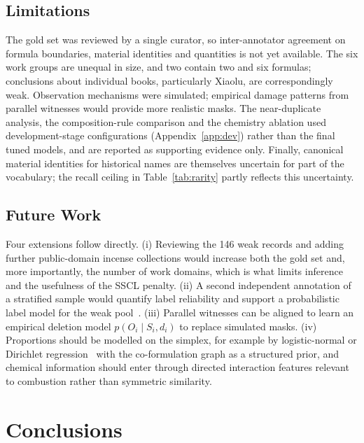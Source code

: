 \documentclass[applsci,article,submit,oneauthor]{Definitions/mdpi}
\begin{document}
\subsection{Limitations}
The gold set was reviewed by a single curator, so inter-annotator agreement on formula boundaries, material identities and quantities is not yet available. The six work groups are unequal in size, and two contain two and six formulas; conclusions about individual books, particularly Xiaolu, are correspondingly weak. Observation mechanisms were simulated; empirical damage patterns from parallel witnesses would provide more realistic masks. The near-duplicate analysis, the composition-rule comparison and the chemistry ablation used development-stage configurations (Appendix~\ref{app:dev}) rather than the final tuned models, and are reported as supporting evidence only. Finally, canonical material identities for historical names are themselves uncertain for part of the vocabulary; the recall ceiling in Table~\ref{tab:rarity} partly reflects this uncertainty.

\subsection{Future Work}
Four extensions follow directly. (i) Reviewing the 146 weak records and adding further public-domain incense collections would increase both the gold set and, more importantly, the number of work domains, which is what limits inference and the usefulness of the SSCL penalty. (ii) A second independent annotation of a stratified sample would quantify label reliability and support a probabilistic label model for the weak pool~\cite{ratner2017}. (iii) Parallel witnesses can be aligned to learn an empirical deletion model $p(O_i\mid S_i,d_i)$ to replace simulated masks. (iv) Proportions should be modelled on the simplex, for example by logistic-normal or Dirichlet regression~\cite{aitchison1982} with the co-formulation graph as a structured prior, and chemical information should enter through directed interaction features relevant to combustion rather than symmetric similarity.

\section{Conclusions}
\label{sec:conclusions}
\end{document}
